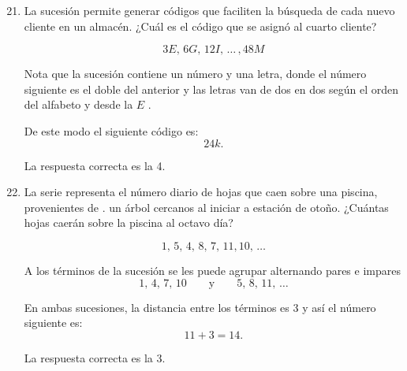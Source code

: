 \documentclass[11pt, a4paper]{article} %
\theoremstyle{dotlessP}
\theoremstyle{dotlessS}
\begin{document}
\begin{enumerate}[label=\color{dg}\theenumi.]
        \setcounter{enumi}{20}
        \normalsize
        \item {\color{db}La sucesión permite generar códigos que faciliten la búsqueda de cada nuevo cliente en un almacén. ¿Cuál es el código que se asignó al cuarto cliente?
        
        \[
       	 3E,\, 6G,\, 12I, \,\dots\, , 48M
        \]
}
Nota que la sucesión contiene un número y una letra, donde el número siguiente es el doble del anterior y las letras van de dos en dos según el orden del alfabeto y desde la \(	E\) .

De este modo el siguiente código es: 
\[
	24k.
\]

   {\color{dh} La respuesta correcta es la 4.}
   
   
\item {\color{db}La serie representa el número diario de hojas que caen sobre una piscina, provenientes de . un árbol cercanos al iniciar a estación de otoño. ¿Cuántas hojas caerán sobre la piscina al octavo día?
        
        \[
      	  1,\, 5,\, 4, \,8,\,7,\,11, 10,\, \dots 
        \]
}   

A los términos de la sucesión se les puede agrupar alternando pares e impares
\[
	1,\,4, \,7,\,10 \qquad \text{y}\qquad 5,\, 8 , \, 11, \, \dots
\]

En ambas sucesiones, la distancia entre los términos es \(3\) y así el número siguiente es:
\[
	11 + 3 = 14.
\]


   {\color{dh} La respuesta correcta es la 3.}
   

\end{enumerate}
\end{document}
